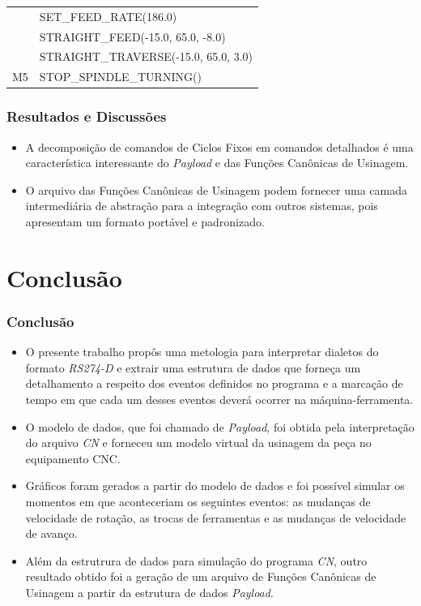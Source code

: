 \documentclass[aspectratio=169]{beamer}
\begin{document}
{\begin{frame}[fragile]
\begin{tabular}{ |l|l| }
    & \scriptsize{SET\_FEED\_RATE(186.0)} \\
    & \scriptsize{STRAIGHT\_FEED(-15.0, 65.0, -8.0)} \\
    & \scriptsize{STRAIGHT\_TRAVERSE(-15.0, 65.0, 3.0)} \\

    \hline
    \scriptsize{M5} & \scriptsize{STOP\_SPINDLE\_TURNING()} \\
    \hline

  \end{tabular}  

\end{frame}


\begin{frame}[fragile]
  \frametitle{Resultados e Discussões}

  \begin{itemize}
    \item A decomposição de comandos de Ciclos Fixos em comandos 
          detalhados é uma característica interessante do \emph{Payload} 
          e das Funções Canônicas de Usinagem.
    \item O arquivo das Funções Canônicas de Usinagem podem fornecer uma 
          camada intermedi\'aria de abstra\c c\~ao para a integração 
          com outros sistemas, pois apresentam um formato port\'avel e 
          padronizado.
  \end{itemize}
  
\end{frame}


\section{Conclusão}

\begin{frame}
  \frametitle{Conclusão}

  \begin{itemize}
    \item O presente trabalho propôs uma metologia para interpretar 
          dialetos do formato \emph{RS274-D} e extrair uma estrutura de 
          dados que forneça um detalhamento a respeito dos eventos 
          definidos no programa e a marcação de tempo em que cada um 
          desses eventos deverá ocorrer na máquina-ferramenta.
    \item O modelo de dados, que foi chamado de \emph{Payload}, foi obtida 
          pela interpretação do arquivo \emph{CN} e forneceu um modelo 
          virtual da usinagem da peça no equipamento CNC.
    \item Gráficos foram gerados a partir do modelo de dados e foi possível 
          simular os momentos em que aconteceriam os seguintes eventos: 
          as mudanças de velocidade de rotação, as trocas de ferramentas 
          e as mudanças de velocidade de avanço.
    \item Além da estrutrura de dados para simulação do programa \emph{CN},
          outro resultado obtido foi a geração de um arquivo de Funções 
          Canônicas de Usinagem a partir da estrutura de dados 
          \emph{Payload}.


\end{itemize}
\end{frame}}
\end{document}
